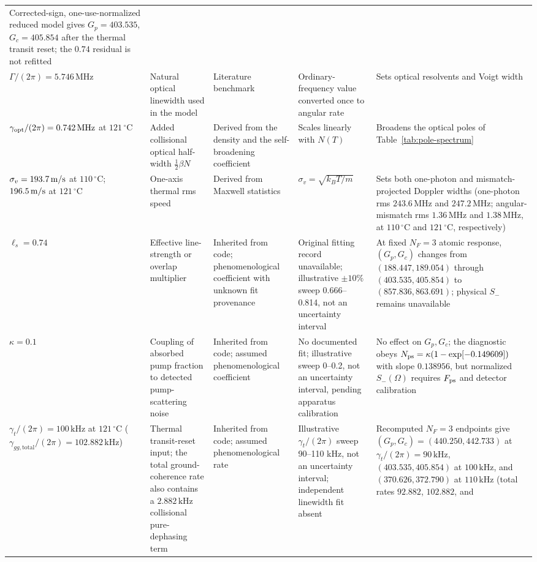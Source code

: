 \documentclass[11pt,a4paper]{article}
\newcommand{\MHz}{\,\mathrm{MHz}}
\newcommand{\kHz}{\,\mathrm{kHz}}
\newcommand{\degC}{\,^{\circ}\mathrm C}
\begin{document}
\begin{longtable}{L{2.8cm}L{3.4cm}L{2.5cm}L{3.4cm}L{3.4cm}}
Corrected-sign, one-use-normalized reduced model gives
$G_p=403.535$, $G_c=405.854$ after the thermal transit reset; the $0.74$
residual is not refitted\\
$\Gamma/(2\pi)=5.746\MHz$ &
Natural optical linewidth used in the model &
Literature benchmark &
Ordinary-frequency value converted once to angular rate &
Sets optical resolvents and Voigt width\\
$\gamma_{\rm opt}/(2\pi)=0.742\MHz$ at $121\degC$ &
Added collisional optical half-width $\tfrac12\beta N$ &
Derived from the density and the self-broadening coefficient &
Scales linearly with $N(T)$ &
Broadens the optical poles of Table~\ref{tab:pole-spectrum}\\
$\sigma_v=193.7\,{\rm m/s}$ at $110\degC$;
$196.5\,{\rm m/s}$ at $121\degC$ &
One-axis thermal rms speed &
Derived from Maxwell statistics &
$\sigma_v=\sqrt{k_BT/m}$ &
Sets both one-photon and mismatch-projected Doppler widths
(one-photon rms $243.6\MHz$ and $247.2\MHz$; angular-mismatch rms
$1.36\MHz$ and $1.38\MHz$, at $110\degC$ and $121\degC$, respectively)\\
$\ell_s=0.74$ &
Effective line-strength or overlap multiplier &
Inherited from code; phenomenological coefficient with unknown fit provenance &
Original fitting record unavailable; illustrative $\pm10\%$ sweep
0.666--0.814, not an uncertainty interval &
At fixed $N_F=3$ atomic response, $(G_p,G_c)$ changes from
$(188.447,189.054)$ through $(403.535,405.854)$ to $(857.836,863.691)$;
physical $S_-$ remains unavailable\\
$\kappa=0.1$ &
Coupling of absorbed pump fraction to detected pump-scattering noise &
Inherited from code; assumed phenomenological coefficient &
No documented fit; illustrative sweep 0--0.2, not an uncertainty interval,
pending apparatus calibration &
No effect on $G_p,G_c$; the diagnostic obeys
$N_{\rm ps}=\kappa(1-\exp[-0.149609])$ with slope $0.138956$, but normalized
$S_-(\Omega)$ requires $F_{\rm ps}$ and detector calibration\\
$\gamma_t/(2\pi)=100\kHz$ at $121\degC$
($\gamma_{gg,\mathrm{total}}/(2\pi)=102.882\kHz$) &
Thermal transit-reset input; the total ground-coherence rate also contains a
$2.882\kHz$ collisional pure-dephasing term &
Inherited from code; assumed phenomenological rate &
Illustrative $\gamma_t/(2\pi)$ sweep 90--110 kHz, not an uncertainty interval;
independent linewidth fit absent &
Recomputed $N_F=3$ endpoints give $(G_p,G_c)=(440.250,442.733)$ at
$\gamma_t/(2\pi)=90\kHz$, $(403.535,405.854)$ at $100\kHz$, and
$(370.626,372.790)$ at $110\kHz$ (total rates $92.882$, $102.882$, and

\end{longtable}
\end{document}
